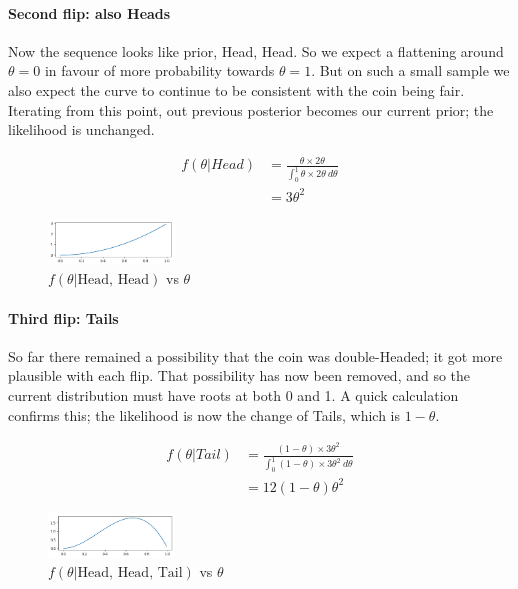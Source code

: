 \documentclass{article}
\begin{document}
\paragraph{Second flip: also Heads}
Now the sequence looks like {prior, Head, Head}. So we expect a flattening around $\theta=0$ in favour of more probability towards $\theta=1$. But on such a small sample we also expect the curve to continue to be consistent with the coin being fair. Iterating from this point, out previous posterior becomes our current prior; the likelihood is unchanged.

\begin{equation}
\begin{split}
f(\theta|{Head})
&= \frac{\theta \times 2\theta}{\int_0^1 \theta \times 2\theta \ d\theta} \\
&= 3\theta^2
\end{split}
\end{equation}

\begin{figure}[h]
\centering
\includegraphics[width=0.3\textwidth]{3_HH.png}
\caption{\label{fig:HH} $f(\theta|\text{Head, Head})$ vs $\theta$}
\end{figure}

\paragraph{Third flip: Tails}
So far there remained a possibility that the coin was double-Headed; it got more plausible with each flip. That possibility has now been removed, and so the current distribution must have roots at both 0 and 1. A quick calculation confirms this; the likelihood is now the change of Tails, which is $1 - \theta$.

\begin{equation}
\begin{split}
f(\theta|{Tail})
&= \frac{(1-\theta) \times 3\theta^2}{\int_0^1 (1-\theta) \times 3\theta^2 \ d\theta} \\
&= 12(1-\theta)\theta^2
\end{split}
\end{equation}

\begin{figure}[h]
\centering
\includegraphics[width=0.3\textwidth]{4_HHT.png}
\caption{\label{fig:HHT} $f(\theta|\text{Head, Head, Tail})$ vs $\theta$}
\end{figure}
\end{document}
